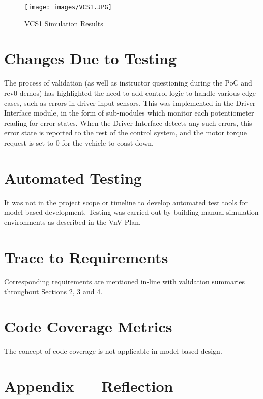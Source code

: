 \documentclass[12pt, titlepage]{article}
\begin{document}
\begin{figure}[h!]
    \texttt{[image: images/VCS1.JPG]}
    \centering
    \caption{VCS1 Simulation Results}
\end{figure} 

\section{Changes Due to Testing}

The process of validation (as well as instructor questioning during the PoC and rev0 demos) has highlighted the need to add control logic to handle various edge cases, such as errors in driver input sensors. This was implemented in the Driver Interface module, in the form of sub-modules which monitor each potentiometer reading for error states. When the Driver Interface detects any such errors, this error state is reported to the rest of the control system, and the motor torque request is set to 0 for the vehicle to coast down.

\section{Automated Testing}

It was not in the project scope or timeline to develop automated test tools for model-based development. Testing was carried out by building manual simulation environments as described in the VnV Plan.
		
\section{Trace to Requirements}

Corresponding requirements are mentioned in-line with validation summaries throughout Sections 2, 3 and 4.

\section{Code Coverage Metrics}

The concept of code coverage is not applicable in model-based design.




\newpage{}
\section*{Appendix --- Reflection}
\end{document}
